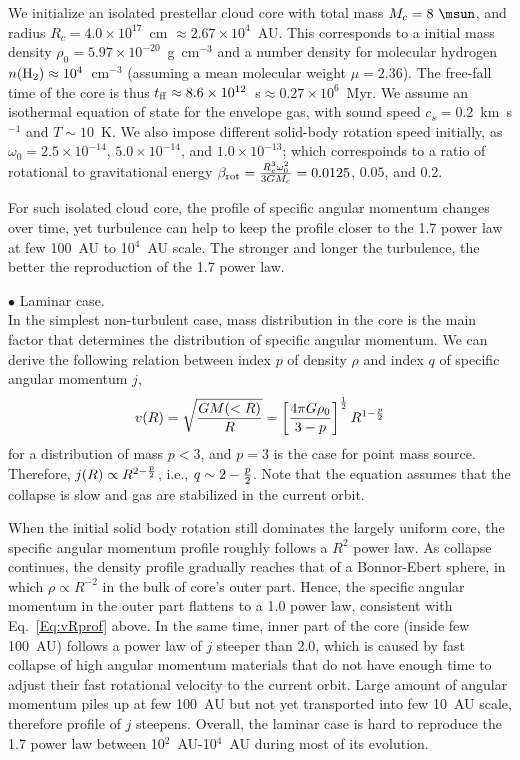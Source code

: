 We initialize an isolated prestellar cloud core with total mass
$M_c=8~\msun$, and radius $R_c=4.0 \times 10^{17}$~cm
$\approx 2.67 \times 10^4$~AU. This corresponds to a initial mass density
$\rho_0=5.97 \times 10^{-20}$~g~cm$^{-3}$ and a number density for molecular
hydrogen $n({\rm H}_2) \approx 10^4$~cm$^{-3}$ (assuming a mean molecular
weight $\mu=2.36$). The free-fall time of the core is thus
$t_{\rm ff} \approx 8.6 \times 10^{12}$~s$\approx 0.27 \times 10^6$~Myr.
We assume an isothermal equation of state for the envelope gas, with
sound speed $c_s=0.2$~km~s$^{-1}$ and $T \sim 10$~K. We also impose different
solid-body rotation speed initially, as $\omega_0=2.5 \times 10^{-14}$,
$5.0 \times 10^{-14}$, and $1.0 \times 10^{-13}$; which correspoinds to
a ratio of rotational to gravitational energy
$\beta_{\rm rot}={R_c^3 \omega_0^2 \over 3 G M_c} = 0.0125$, $0.05$, and
$0.2$.

For such isolated cloud core, the profile of specific angular momentum
changes over time, yet turbulence can help to keep the profile
closer to the 1.7 power law at few 100~AU to 10$^4$~AU scale.
The stronger and longer the turbulence,
the better the reproduction of the 1.7 power law.

\noindent $\bullet$ Laminar case.\\
In the simplest non-turbulent case, mass distribution in the core is the main 
factor that determines the distribution of specific angular momentum. 
We can derive the following relation between index $p$ of density $\rho$ and 
index $q$ of specific angular momentum $j$, 
\begin{equation}
\label{Eq:vRprof}
v(R)=\sqrt{G M(<R) \over R}=\left[{ 4 \pi G \rho_0 \over 3-p}\right]^{1 \over 2
} R^{1-{p \over 2}}
\end{equation}
for a distribution of mass $p<3$, and $p=3$ is the case for point mass source.
Therefore, $j(R) \propto R^{2-{p \over 2}}$, i.e., $q \sim 2-{p \over2 }$. 
Note that the equation assumes that the collapse is slow and gas are stabilized 
in the current orbit.

When the initial solid body rotation still dominates the largely uniform core,
the specific angular momentum profile roughly follows a $R^2$ power law.
As collapse continues, the density profile gradually reaches
that of a Bonnor-Ebert sphere, in which $\rho \propto R^{-2}$
in the bulk of core's outer part.
Hence, the specific angular momentum in the outer part flattens to
a 1.0 power law, consistent with Eq.~\ref{Eq:vRprof} above. In the same
time, inner part of the core (inside few 100~AU) follows a power law of
$j$ steeper than 2.0, which is caused by fast collapse of high angular momentum
materials that do not have enough time to adjust their fast
rotational velocity to the current orbit. Large amount of angular
momentum piles up at few 100~AU but not yet transported into few 10~AU scale,
therefore profile of $j$ steepens. Overall, the laminar case is hard
to reproduce the 1.7 power law between
10$^2$~AU-10$^4$~AU during most of its evolution.

